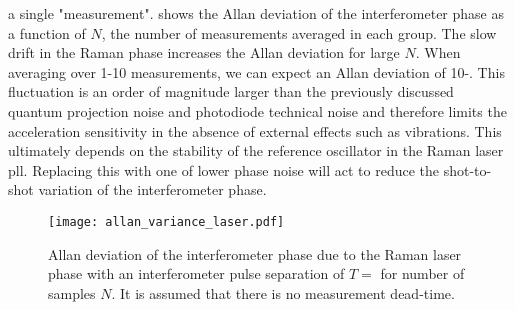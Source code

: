 a single "measurement".
 shows the Allan deviation of the 
interferometer phase as a function of $N$, the number of measurements
averaged in each group. The slow drift in the Raman
phase increases the Allan deviation for large
$N$. When averaging over 1-10 measurements, we can expect an Allan
deviation of 
10-. This fluctuation is an order of magnitude
larger than the previously discussed quantum projection noise and photodiode technical
noise and therefore limits the acceleration sensitivity in the absence
of external effects such as vibrations. This ultimately depends on the
stability of the reference oscillator in the Raman laser \ac{pll}.
Replacing this with one of lower phase noise will act to reduce the
shot-to-shot variation of the interferometer phase. 
\begin{figure}[htpb!]
  \centering
  \texttt{[image: allan\_variance\_laser.pdf]}
  \caption[Allan deviation of the interferometer phase due to the
  Raman laser phase.]{Allan
    deviation of the interferometer phase due to the Raman laser phase
    with an
    interferometer pulse separation of $T = $  for
  number of samples $N$. It is assumed that there is no measurement
dead-time.}
  \label{fig:allan_dev_m2}
\end{figure}

